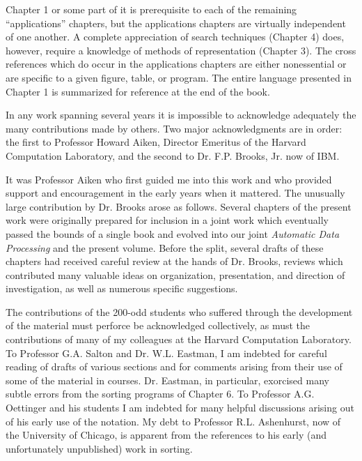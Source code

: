 \par Chapter 1 or some part of it is prerequisite to each of the remaining ``applications'' chapters, but the applications chapters are virtually independent of one another. A complete appreciation of search techniques (Chapter 4) does, however, require a knowledge of methods of representation (Chapter 3). The cross references which do occur in the applications chapters are either nonessential or are specific to a given figure, table, or program. The entire language presented in Chapter 1 is summarized for reference at the end of the book.

\par In any work spanning several years it is impossible to acknowledge adequately the many contributions made by others. Two major acknowledgments are in order: the first to Professor Howard Aiken, Director Emeritus of the Harvard Computation Laboratory, and the second to Dr. F.P. Brooks, Jr. now of IBM.

\par It was Professor Aiken who first guided me into this work and who provided support and encouragement in the early years when it mattered. The unusually large contribution by Dr. Brooks arose as follows. Several chapters of the present work were originally prepared for inclusion in a joint work which eventually passed the bounds of a single book and evolved into our joint \textit{Automatic Data Processing} and the present volume. Before the split, several drafts of these chapters had received careful review at the hands of Dr. Brooks, reviews which contributed many valuable ideas on organization, presentation, and direction of investigation, as well as numerous specific suggestions.

\par The contributions of the 200-odd students who suffered through the development of the material must perforce be acknowledged collectively, as must the contributions of many of my colleagues at the Harvard Computation Laboratory. To Professor G.A. Salton and Dr. W.L. Eastman, I am indebted for careful reading of drafts of various sections and for comments arising from their use of some of the material in courses. Dr. Eastman, in particular, exorcised many subtle errors from the sorting programs of Chapter 6. To Professor A.G. Oettinger and his students I am indebted for many helpful discussions arising out of his early use of the notation. My debt to Professor R.L. Ashenhurst, now of the University of Chicago, is apparent from the references to his early (and unfortunately unpublished) work in sorting.

